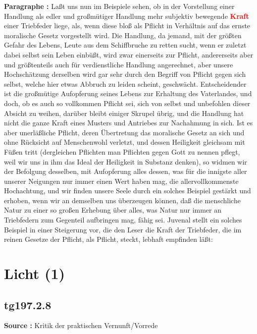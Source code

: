 \documentclass[a4paper,12pt,twoside]{book}
\newcommand{\match}[1]{\textcolor{red}{\textbf{#1}}}
\newcommand{\unnumberedsection}[1]{
	\section*{#1}
	\addcontentsline{toc}{section}{#1}
	\markright{#1}
}
\begin{document}
	\textbf{Paragraphe : }Laßt uns nun im Beispiele sehen, ob in der Vorstellung einer Handlung als edler und großmütiger Handlung mehr subjektiv bewegende \match{Kraft} einer Triebfeder liege, als, wenn diese bloß als Pflicht in Verhältnis auf das ernste moralische Gesetz vorgestellt wird. Die Handlung, da jemand, mit der größten Gefahr des Lebens, Leute aus dem Schiffbruche zu retten sucht, wenn er zuletzt dabei selbst sein Leben einbüßt, wird zwar einerseits zur Pflicht, andererseits aber und größtenteils auch für verdienstliche Handlung angerechnet, aber unsere Hochschätzung derselben wird gar sehr durch den Begriff von Pflicht gegen sich selbst, welche hier etwas Abbruch zu leiden scheint, geschwächt. Entscheidender ist die großmütige Aufopferung seines Lebens zur Erhaltung des Vaterlandes, und doch, ob es auch so vollkommen Pflicht sei, sich von selbst und unbefohlen dieser Absicht zu weihen, darüber bleibt einiger Skrupel übrig, und die Handlung hat nicht die ganze Kraft eines Musters und Antriebes zur Nachahmung in sich. Ist es aber unerläßliche Pflicht, deren Übertretung das moralische Gesetz an sich und ohne Rücksicht auf Menschenwohl verletzt, und dessen Heiligkeit gleichsam mit Füßen tritt (dergleichen Pflichten man Pflichten gegen Gott zu nennen pflegt, weil wir uns in ihm das Ideal der Heiligkeit in Substanz denken), so widmen  wir der Befolgung desselben, mit Aufopferung alles dessen, was für die innigste aller unserer Neigungen nur immer einen Wert haben mag, die allervollkommenste Hochachtung, und wir finden unsere Seele durch ein solches Beispiel gestärkt und erhoben, wenn wir an demselben uns überzeugen können, daß die menschliche Natur zu einer so großen Erhebung über alles, was Natur nur immer an Triebfedern zum Gegenteil aufbringen mag, fähig sei. Juvenal stellt ein solches Beispiel in einer Steigerung vor, die den Leser die Kraft der Triebfeder, die im reinen Gesetze der Pflicht, als Pflicht, steckt, lebhaft empfinden läßt: 
	
	\unnumberedsection{Licht (1)} 
	\subsection*{tg197.2.8} 
	\textbf{Source : }Kritik der praktischen Vernunft/Vorrede\\  
	
\end{document}
